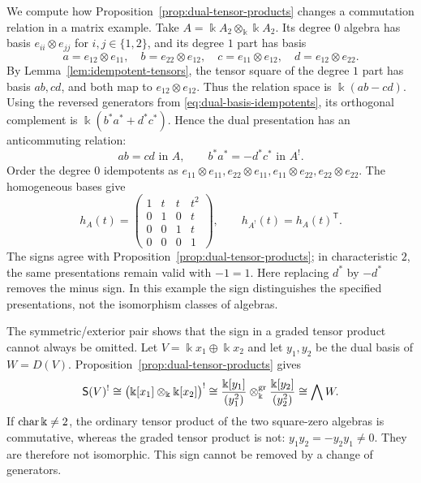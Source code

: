 \begin{advanced}[suppressfirstparskip=true,innertopmargin=0pt]
\begin{example}\label{ex:commuting-square-dual}
We compute how Proposition~\ref{prop:dual-tensor-products} changes a commutation relation in a matrix example.
Take $A=\Bbbk A_2\otimes_\Bbbk\Bbbk A_2$.
Its degree $0$ algebra has basis $e_{ii}\otimes e_{jj}$ for $i,j\in\{1,2\}$, and its degree $1$ part has basis
\[
a=e_{12}\otimes e_{11},\quad
b=e_{22}\otimes e_{12},\quad
c=e_{11}\otimes e_{12},\quad
d=e_{12}\otimes e_{22}.
\]
By Lemma~\ref{lem:idempotent-tensors}, the tensor square of the degree $1$ part has basis $ab,cd$, and both map to $e_{12}\otimes e_{12}$. Thus the relation space is $\Bbbk(ab-cd)$.
Using the reversed generators from \eqref{eq:dual-basis-idempotents}, its orthogonal complement is $\Bbbk(b^*a^*+d^*c^*)$.
Hence the dual presentation has an anticommuting relation:
\[
ab=cd\text{ in }A,\qquad
b^*a^*=-d^*c^*\text{ in }A^!.
\]
Order the degree $0$ idempotents as
$e_{11}\otimes e_{11},e_{22}\otimes e_{11},e_{11}\otimes e_{22},e_{22}\otimes e_{22}$.
The homogeneous bases give
\[
h_A(t)=\begin{pmatrix}
1&t&t&t^2\\
0&1&0&t\\
0&0&1&t\\
0&0&0&1
\end{pmatrix},\qquad
h_{A^!}(t)=h_A(t)^{\mathsf T}.
\]
The signs agree with Proposition~\ref{prop:dual-tensor-products}; in characteristic $2$, the same presentations remain valid with $-1=1$.
Here replacing $d^*$ by $-d^*$ removes the minus sign. In this example the sign distinguishes the specified presentations, not the isomorphism classes of algebras.
\end{example}

\begin{example}\label{ex:essential-tensor-sign}
The symmetric/exterior pair shows that the sign in a graded tensor product cannot always be omitted.
Let $V=\Bbbk x_1\oplus\Bbbk x_2$ and let $y_1,y_2$ be the dual basis of $W=D(V)$. Proposition~\ref{prop:dual-tensor-products} gives
\[
\mathsf{S}(V)^!
\cong\bigl(\Bbbk[x_1]\otimes_\Bbbk\Bbbk[x_2]\bigr)^!
\cong\frac{\Bbbk[y_1]}{(y_1^2)}\otimes_\Bbbk^{\mathrm{gr}}
       \frac{\Bbbk[y_2]}{(y_2^2)}
\cong\bigwedge W.
\]
If $\operatorname{char}\Bbbk\neq2$, the ordinary tensor product of the two square-zero algebras is commutative, whereas the graded tensor product is not: $y_1y_2=-y_2y_1\neq0$.
They are therefore not isomorphic. This sign cannot be removed by a change of generators.
\end{example}
\end{advanced}

